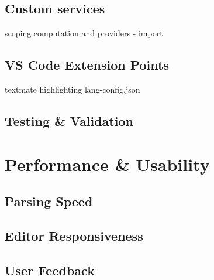 \section*{Custom services}
\label{sec:customservices}
scoping computation and providers - import
\section{VS Code Extension Points}
textmate highlighting lang-config.json
\section{Testing \& Validation}

\chapter{Performance \& Usability}
\section{Parsing Speed}
\section{Editor Responsiveness}
\section{User Feedback}
